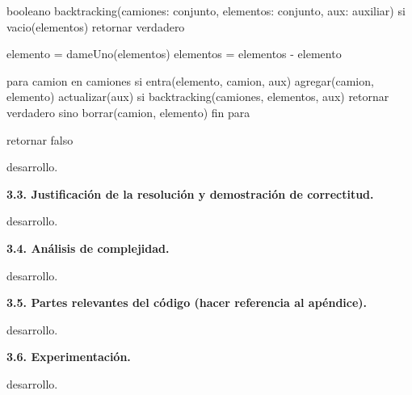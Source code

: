 booleano backtracking(camiones: conjunto, elementos: conjunto, aux: auxiliar)
  si vacio(elementos)
    retornar verdadero
  
  elemento = dameUno(elementos)
  elementos = elementos - elemento
  
  para camion en camiones
    si entra(elemento, camion, aux)
      agregar(camion, elemento)
      actualizar(aux)
      si backtracking(camiones, elementos, aux)
        retornar verdadero
      sino
        borrar(camion, elemento)
  fin para
  
  retornar falso


 
\vspace*{0.3cm}

desarrollo.


\vspace*{0.75cm} \noindent


\noindent
\textbf{3.3. Justificación de la resolución y demostración de correctitud.}

\vspace*{0.3cm}

desarrollo.


\vspace*{0.75cm} \noindent



\noindent
\textbf{3.4. Análisis de complejidad.}

\vspace*{0.3cm}

desarrollo.


\vspace*{0.75cm} \noindent



\noindent
\textbf{3.5. Partes relevantes del código (hacer referencia al apéndice).}

\vspace*{0.3cm}

desarrollo.


\vspace*{0.75cm} \noindent



\noindent
\textbf{3.6. Experimentación.}

\vspace*{0.3cm}

desarrollo.
